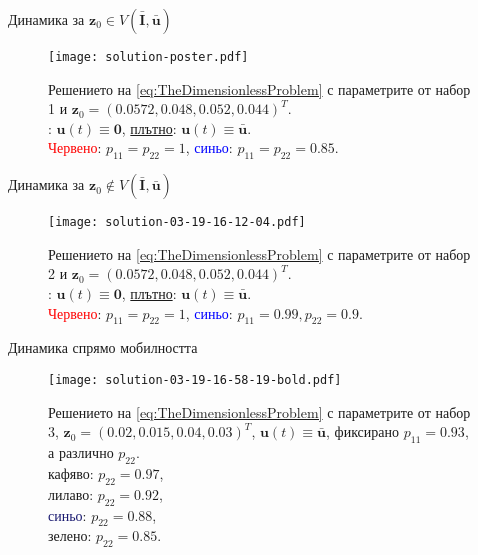 \begin{frame}[t]{Динамика за $\boldsymbol{z}_0 \in V(\bar{\boldsymbol{I}}, \bar{\boldsymbol{u}})$}
  \begin{figure}[h]
    \centering
    \texttt{[image: solution-poster.pdf]}
    \caption{
      Решението на \eqref{eq:TheDimensionlessProblem} с параметрите от набор 1 и $\boldsymbol{z}_0=(0.0572, 0.048, 0.052, 0.044)^T$.\\
      : $\boldsymbol{u}(t) \equiv \pmb{0}$, \underline{плътно}: $\boldsymbol{u}(t) \equiv \bar{\boldsymbol{u}}$.\\
      \textcolor{red}{Червено}: $p_{11}=p_{22}=1$, \textcolor{blue}{синьо}: $p_{11}=p_{22}=0.85$.
    }
    \label{fig:Solution-poster}
  \end{figure}
\end{frame}

\begin{frame}[t]{Динамика за $\boldsymbol{z}_0 \notin V(\bar{\boldsymbol{I}}, \bar{\boldsymbol{u}})$}
  \begin{figure}[h]
    \centering
    \texttt{[image: solution-03-19-16-12-04.pdf]}
    \caption{
      Решението на \eqref{eq:TheDimensionlessProblem} с параметрите от набор 2 и $\boldsymbol{z}_0=(0.0572, 0.048, 0.052, 0.044)^T$.\\
      : $\boldsymbol{u}(t) \equiv \pmb{0}$, \underline{плътно}: $\boldsymbol{u}(t) \equiv \bar{\boldsymbol{u}}$.\\
      \textcolor{red}{Червено}: $p_{11}=p_{22}=1$, \textcolor{blue}{синьо}: $p_{11}=0.99, p_{22}=0.9$.
    }
    \label{fig:Solution-03-19-16-12-04}
  \end{figure}
\end{frame}

\begin{frame}[t]{Динамика спрямо мобилността}
  \begin{figure}[h]
    \centering
    \texttt{[image: solution-03-19-16-58-19-bold.pdf]}
    \caption{
      Решението на \eqref{eq:TheDimensionlessProblem} с параметрите от набор 3, $\boldsymbol{z}_0=(0.02, 0.015, 0.04, 0.03)^T$, $\boldsymbol{u}(t) \equiv \bar{\boldsymbol{u}}$, фиксирано $p_{11}=0.93$, а различно $p_{22}$.\\
      \textcolor{Sienna4}{кафяво}: $p_{22}=0.97$,\\
      \textcolor{Orchid4}{лилаво}: $p_{22}=0.92$,\\
      \textcolor{MidnightBlue}{синьо}: $p_{22}=0.88$,\\
      \textcolor{DarkChartreuse}{зелено}: $p_{22}=0.85$.\\
    }
    \label{fig:Solution-03-19-16-58-19}
  \end{figure}
\end{frame}
